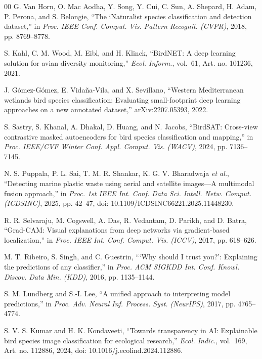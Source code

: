 \documentclass[conference]{IEEEtran}
\begin{document}
\begin{thebibliography}{00}
 G. Van Horn, O. Mac Aodha, Y. Song, Y. Cui, C. Sun, A. Shepard,
H. Adam, P. Perona, and S. Belongie, ``The iNaturalist species classification and
detection dataset,'' in \emph{Proc. IEEE Conf. Comput. Vis. Pattern Recognit.
(CVPR)}, 2018, pp. 8769--8778.

 S. Kahl, C. M. Wood, M. Eibl, and H. Klinck, ``BirdNET: A deep
learning solution for avian diversity monitoring,'' \emph{Ecol. Inform.}, vol.~61,
Art. no. 101236, 2021.

 J. G\'omez-G\'omez, E. Vida\~na-Vila, and X. Sevillano,
``Western Mediterranean wetlands bird species classification: Evaluating
small-footprint deep learning approaches on a new annotated dataset,''
arXiv:2207.05393, 2022.

 S. Sastry, S. Khanal, A. Dhakal, D. Huang, and N. Jacobs,
``BirdSAT: Cross-view contrastive masked autoencoders for bird species
classification and mapping,'' in \emph{Proc. IEEE/CVF Winter Conf. Appl. Comput.
Vis. (WACV)}, 2024, pp. 7136--7145.

 N. S. Puppala, P. L. Sai, T. M. R. Shankar,
K. G. V. Bharadwaja \emph{et al.}, ``Detecting marine plastic waste using aerial and
satellite images---A multimodal fusion approach,'' in \emph{Proc. 1st IEEE Int.
Conf. Data Sci. Intell. Netw. Comput. (ICDSINC)}, 2025, pp. 42--47,
doi: 10.1109/ICDSINC66221.2025.11448230.

 R. R. Selvaraju, M. Cogswell, A. Das, R. Vedantam,
D. Parikh, and D. Batra, ``Grad-CAM: Visual explanations from deep networks via
gradient-based localization,'' in \emph{Proc. IEEE Int. Conf. Comput. Vis.
(ICCV)}, 2017, pp. 618--626.

 M. T. Ribeiro, S. Singh, and C. Guestrin, ```Why should I
trust you?': Explaining the predictions of any classifier,'' in \emph{Proc. ACM
SIGKDD Int. Conf. Knowl. Discov. Data Min. (KDD)}, 2016, pp. 1135--1144.

 S. M. Lundberg and S.-I. Lee, ``A unified approach to
interpreting model predictions,'' in \emph{Proc. Adv. Neural Inf. Process. Syst.
(NeurIPS)}, 2017, pp. 4765--4774.

 S. V. S. Kumar and H. K. Kondaveeti, ``Towards transparency in
AI: Explainable bird species image classification for ecological research,''
\emph{Ecol. Indic.}, vol.~169, Art. no. 112886, 2024,
doi: 10.1016/j.ecolind.2024.112886.


\end{thebibliography}
\end{document}
